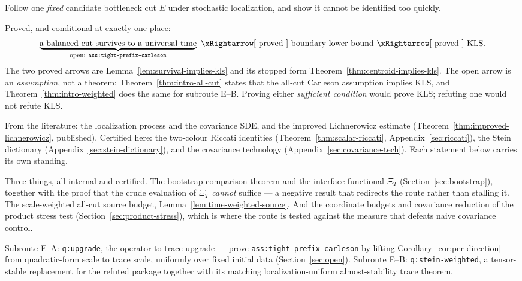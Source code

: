 \documentclass[../../main.tex]{subfiles}
\begin{document}
\begin{description}[leftmargin=0pt,style=nextline,itemsep=0.3em]
  \item[1. Thesis.] Follow one \emph{fixed} candidate bottleneck cut $E$ under stochastic
  localization, and show it cannot be identified too quickly.

  \item[2. Bridge to KLS.] Proved, and conditional at exactly one place:
  \[
    \underbrace{\text{a balanced cut survives to a universal time}}_{\text{open: }
    \texttt{ass:tight-prefix-carleson}}
    \ \xRightarrow[\ \text{proved}\ ]{}\
    \text{boundary lower bound}
    \ \xRightarrow[\ \text{proved}\ ]{}\
    \text{KLS}.
  \]
  The two proved arrows are Lemma~\ref{lem:survival-implies-kls} and its stopped form
  Theorem~\ref{thm:centroid-implies-kls}. The open arrow is an \emph{assumption}, not a
  theorem: Theorem~\ref{thm:intro-all-cut} states that the all-cut Carleson assumption implies
  KLS, and Theorem~\ref{thm:intro-weighted} does the same for subroute E--B. Proving either
  \emph{sufficient condition} would prove KLS; refuting one would not refute KLS.

  \item[3. Established inputs.] From the literature: the localization process and the
  covariance SDE, and the improved Lichnerowicz estimate
  (Theorem~\ref{thm:improved-lichnerowicz}, published). Certified here: the two-colour Riccati
  identities (Theorem~\ref{thm:scalar-riccati}, Appendix~\ref{sec:riccati}), the Stein
  dictionary (Appendix~\ref{sec:stein-dictionary}), and the covariance technology
  (Appendix~\ref{sec:covariance-tech}). Each statement below carries its own standing.

  \item[4. Main advance so far.] Three things, all internal and certified. The bootstrap
  comparison theorem and the interface functional $\Xi_T$ (Section~\ref{sec:bootstrap}),
  together with the proof that the crude evaluation of $\Xi_T$ \emph{cannot} suffice --- a
  negative result that redirects the route rather than stalling it. The scale-weighted all-cut
  source budget, Lemma~\ref{lem:time-weighted-source}. And the coordinate budgets and
  covariance reduction of the product stress test (Section~\ref{sec:product-stress}), which is
  where the route is tested against the measure that defeats naive covariance control.

  \item[5. Exact bottleneck.] Subroute E--A: \texttt{q:upgrade}, the operator-to-trace upgrade
  --- prove \texttt{ass:tight-prefix-carleson} by lifting
  Corollary~\ref{cor:per-direction} from quadratic-form scale to trace scale, uniformly over
  fixed initial data (Section~\ref{sec:open}). Subroute E--B: \texttt{q:stein-weighted}, a
  tensor-stable replacement for the refuted package together with its matching
  localization-uniform almost-stability trace theorem.


\end{description}
\end{document}
